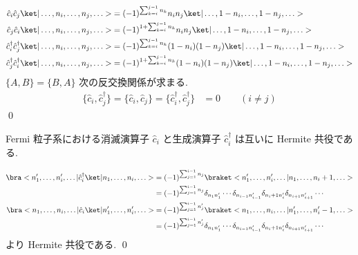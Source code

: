 \documentclass[uplatex,dvipdfmx,a4paper,11pt]{jlreq}
\makeatletter
\numberwithin{equation}{section}
\theoremstyle{definition}
\renewenvironment{proof}[1][\proofname]{\par
  \normalfont
  \topsep6\p@\@plus6\p@ \trivlist
  \item[\hskip\labelsep{\bfseries #1}\@addpunct{\bfseries}]\ignorespaces\quad\par
}{%
  \qed\endtrivlist\@endpefalse
}
\renewcommand\proofname{証明}
\makeatother
\begin{document}
\begin{proof}
\begin{align}
    \hat{c}_i\hat{c}_j\ket|\ldots,n_i,\ldots,n_j,\ldots>                 & = (-1)^{\sum_{k=i}^{j-1}n_k}n_in_j\ket|\ldots,1-n_i,\ldots,1-n_j,\ldots>                 \\
    \hat{c}_j\hat{c}_i\ket|\ldots,n_i,\ldots,n_j,\ldots>                 & = (-1)^{1 + \sum_{k=i}^{j-1}n_k}n_in_j\ket|\ldots,1-n_i,\ldots,1-n_j,\ldots>             \\
    \hat{c}_i^\dagger\hat{c}_j^\dagger\ket|\ldots,n_i,\ldots,n_j,\ldots> & = (-1)^{\sum_{k=i}^{j-1}n_k}(1 - n_i)(1 - n_j)\ket|\ldots,1-n_i,\ldots,1-n_j,\ldots>     \\
    \hat{c}_j^\dagger\hat{c}_i^\dagger\ket|\ldots,n_i,\ldots,n_j,\ldots> & = (-1)^{1 + \sum_{k=i}^{j-1}n_k}(1 - n_i)(1 - n_j)\ket|\ldots,1-n_i,\ldots,1-n_j,\ldots>
  \end{align}
  $\{A, B\} = \{B, A\}$ 次の反交換関係が求まる.
  \begin{align}
    \{\hat{c}_i, \hat{c}_j^\dagger\} = \{\hat{c}_i, \hat{c}_j\} = \{\hat{c}_i^\dagger, \hat{c}_j^\dagger\} & = 0 \qquad (i\neq j)
  \end{align}
\end{proof}

\begin{proposition}
  Fermi 粒子系における消滅演算子 $\hat{c}_i$ と生成演算子 $\hat{c}_i^\dagger$ は互いに Hermite 共役である.
\end{proposition}
\begin{proof}
  \begin{align}
    \bra<n_1',\ldots,n_i',\ldots|\hat{c}_i^\dagger\ket|n_1,\ldots,n_i,\ldots> & = (-1)^{\sum_{j=1}^{i-1}n_j}\braket<n_1',\ldots,n_i',\ldots|n_1,\ldots,n_i+1,\ldots>                                          \\
                                                                              & = (-1)^{\sum_{j=1}^{i-1}n_j}\delta_{n_1n_1'}\cdots\delta_{n_{i-1}n_{i-1}'}\delta_{n_i+1n_{i}'}\delta_{n_{i+1}n_{i+1}'}\cdots  \\
    \bra<n_1,\ldots,n_i,\ldots|\hat{c}_i\ket|n_1',\ldots,n_i',\ldots>         & = (-1)^{\sum_{j=1}^{i-1}n_j'}\braket<n_1,\ldots,n_i,\ldots|n_1',\ldots,n_i'-1,\ldots>                                         \\
                                                                              & = (-1)^{\sum_{j=1}^{i-1}n_j'}\delta_{n_1n_1'}\cdots\delta_{n_{i-1}n_{i-1}'}\delta_{n_i+1n_{i}'}\delta_{n_{i+1}n_{i+1}'}\cdots
  \end{align}
  より Hermite 共役である.
\end{proof}
\end{document}
